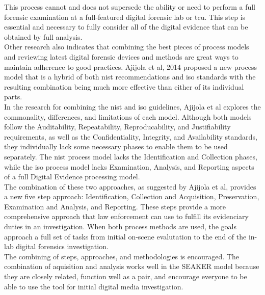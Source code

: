 \documentclass[12pt]{article}
\begin{document}
This process cannot and does not supersede the ability or need to perform a full forensic
examination at a full-featured digital forensic lab\cite{rogers2006computer} or \gls{tcu}.  This
step is essential and necessary to fully consider all of the digital evidence that can
be obtained by full analysis.\\

Other research also indicates that combining the best pieces of process models and reviewing
latest digital forensic devices and methods are great ways to maintain adherence to 
good practices\cite{ajijola2014review}.  Ajijola et al, 2014\cite{ajijola2014review}
proposed a new process model that is a hybrid of both \gls{nist} recommendations and \gls{iso} standards
with the resulting combination being much more effective than either of its individual parts.\\

In the research for combining the \gls{nist} and \gls{iso} guidelines, Ajijola et al\cite{ajijola2014review}
explores the commonality, differences, and limitations of each model.  Although both models
follow the Auditability, Repeatability, Reproducability, and Justifiability requirements, as
well as the Confidentiality, Integrity, and Availability standards, they individually lack some
necessary phases to enable them to be used separately.  The \gls{nist} process model lacks the
Identification and Collection phases, while the \gls{iso} process model lacks Examination, Analysis,
and Reporting aspects of a full Digital Evidence processing model.\\

The combination of these two approaches, as suggested by Ajijola et al\cite{ajijola2014review},
provides a new five step approach: Identification, Collection and Acquisition, Preservation,
Examination and Analysis, and Reporting. These steps provide a more comprehensive approach that
law enforcement can use to fulfill its evidenciary duties in an investigation.  When both
process methods are used, the goals approach a full set of tasks from initial on-scene
evalutation to the end of the in-lab digital forensics investigation.\\

The combining of steps, approaches, and methodologies is encouraged.  The combination of 
aquisition and analysis works well in the SEAKER model because they are closely related,
function well as a pair, and encourage everyone to be able to use the tool for initial digital
media investigation.\\
\end{document}
